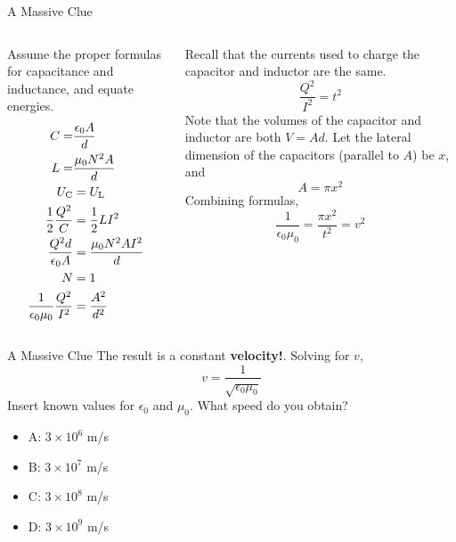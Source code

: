 \documentclass{beamer}
\begin{document}
\begin{frame}{A Massive Clue}
\small
\begin{columns}[T]
\begin{column}{0.5\textwidth}
Assume the proper formulas for capacitance and inductance, and equate energies.
\begin{align}
C =& \frac{\epsilon_0 A}{d} \\
L =& \frac{\mu_0 N^2 A}{d} \\
U_{\rm C} &= U_{\rm L} \\
\frac{1}{2}\frac{Q^2}{C} &= \frac{1}{2}LI^2 \\
\frac{Q^2 d}{\epsilon_0 A} &= \frac{\mu_0 N^2 A I^2}{d} \\
N &= 1 \\
\frac{1}{\epsilon_0 \mu_0} \frac{Q^2}{I^2} &= \frac{A^2}{d^2}
\end{align}
\end{column}
\begin{column}{0.5\textwidth}
Recall that the currents used to charge the capacitor and inductor are the same.
\begin{equation}
\frac{Q^2}{I^2} = t^2
\end{equation}
Note that the volumes of the capacitor and inductor are both $V = Ad$.  Let the lateral dimension of the capacitors (parallel to $A$) be $x$, and 
\begin{equation}
A = \pi x^2
\end{equation}
Combining formulas,
\begin{equation}
\frac{1}{\epsilon_0 \mu_0} = \frac{\pi x^2}{t^2} = v^2
\end{equation}
\end{column}
\end{columns}
\end{frame}

\begin{frame}{A Massive Clue}
\large
The result is a constant \textbf{\alert{velocity!}}.  Solving for $v$,
\begin{equation}
\boxed{v = \frac{1}{\sqrt{\epsilon_0 \mu_0}}}
\end{equation}
Insert known values for $\epsilon_0$ and $\mu_0$.  What speed do you obtain?
\begin{itemize}
\item A: $3\times 10^{6}$ m/s
\item B: $3\times 10^{7}$ m/s
\item C: $3\times 10^{8}$ m/s
\item D: $3\times 10^{9}$ m/s
\end{itemize}
\end{frame}
\end{document}
